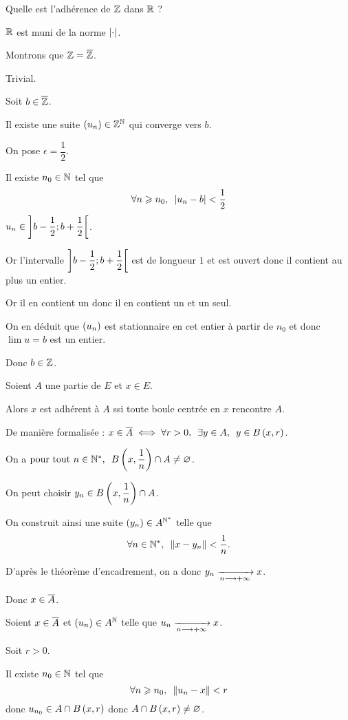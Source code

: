 \begin{exo}
Quelle est l'adhérence de \(\mathbb{Z}\) dans \(\mathbb{R}\) ?
\end{exo}

\begin{corr}
\(\mathbb{R}\) est muni de la norme \(\left\lvert\cdot\right\rvert\).

Montrons que \(\mathbb{Z}=\overline{\mathbb{Z}}\).

\incdir Trivial.

\increc

Soit \(b\in\overline{\mathbb{Z}}\).

Il existe une suite \(\left(u_n\right)\in\mathbb{Z}^{\mathbb{N}}\) qui converge vers \(b\).

On pose \(\epsilon=\dfrac{1}{2}\).

Il existe \(n_0\in\mathbb{N}\) tel que \[\quantifs{\forall n\geq n_0}\abs{u_n-b}<\dfrac{1}{2}\] \ie \(u_n\in\left]b-\dfrac{1}{2};b+\dfrac{1}{2}\right[\).

Or l'intervalle \(\left]b-\dfrac{1}{2};b+\dfrac{1}{2}\right[\) est de longueur \(1\) et est ouvert donc il contient au plus un entier.

Or il en contient un donc il en contient un et un seul.

On en déduit que \(\left(u_n\right)\) est stationnaire en cet entier à partir de \(n_0\) et donc \(\lim u=b\) est un entier.

Donc \(b\in\mathbb{Z}\).
\end{corr}

\begin{prop}
Soient \(A\) une partie de \(E\) et \(x\in E\).

Alors \(x\) est adhérent à \(A\) ssi toute boule centrée en \(x\) rencontre \(A\).

De manière formalisée : \(x\in\conj{A}\ssi\quantifs{\forall r>0;\exists y\in A}y\in\bouleo{x}{r}\).
\end{prop}


\begin{dem}
\imprec

On a \(\quantifs{\tpt n\in\Ns}\bouleo{x}{\dfrac{1}{n}}\inter A\not=\ensvide\).

On peut choisir \(y_n\in\bouleo{x}{\dfrac{1}{n}}\inter A\).

On construit ainsi une suite \(\left(y_n\right)\in A^{\mathbb{N}^*}\) telle que \[\quantifs{\forall n\in\Ns}\norme{x-y_n}<\dfrac{1}{n}.\]

D'après le théorème d'encadrement, on a donc \(y_n\xrightarrow[n\longrightarrow+\infty]{}x\).

Donc \(x\in\overline{A}\).

\impdir

Soient \(x\in\overline{A}\) et \(\left(u_n\right)\in A^{\mathbb{N}}\) telle que \(u_n\xrightarrow[n\longrightarrow+\infty]{}x\).

Soit \(r>0\).

Il existe \(n_0\in\mathbb{N}\) tel que \[\quantifs{\forall n\geq n_0}\norme{u_n-x}<r\] donc \(u_{n_0}\in A\inter\bouleo{x}{r}\) donc \(A\inter\bouleo{x}{r}\not=\ensvide\).
\end{dem}

